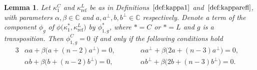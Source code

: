 \documentclass[pdftex]{sigma}
\numberwithin{equation}{section}
\newtheorem{Lemma}[Theorem]{Lemma}
\DeclareMathOperator{\refl}{ref}
\begin{document}
\begin{Lemma}\label{lemma:simplification*1L2}
Let $\kappa^C_1$ and $\kappa^L_{\refl}$ be as in
Definitions~$\ref{def:kappa1}$ and~$\ref{def:kapparefl}$,
with parameters $\alpha, \beta \in \mathbb{C}$ and $a, a^\perp, b, b^\perp \in \mathbb{C}$
respectively.
Denote a term of the component $\phi_g$ of $\phi\big(\kappa^*_1,\kappa^L_{\refl}\big)$
by $\phi^*_{1,g}$, where $*=C$ or $*=L$ and $g$ is a transposition.
Then $\phi^C_{1,g}=0$ if and only if the following conditions hold
\begin{alignat}{3}
\label{Obstr2PhiC1C2C3L2=0a}
&\alpha a + \beta\big(a+(n-2)a^\perp\big)=0, \qquad &&\alpha a^\perp + \beta\big(2a+(n-3)a^\perp\big)=0,&
\\
\label{Obstr2PhiC1C2C3L2=0b}
&\alpha b + \beta\big(b+(n-2)b^\perp\big)=0, \qquad &&\alpha b^\perp + \beta\big(2b+(n-3)b^\perp\big)=0.&
\end{alignat}
\end{Lemma}
\end{document}
